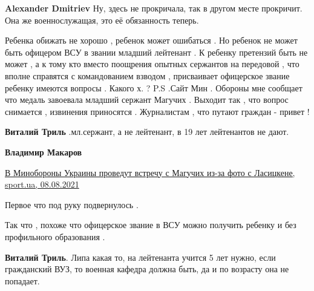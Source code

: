 \begin{itemize}
\begin{itemize}
\textbf{Alexander Dmitriev} Ну, здесь не прокричала, так в другом месте прокричит. Она же военнослужащая, это её обязанность теперь.
\end{itemize}


Ребенка обижать не хорошо , ребенок может ошибаться . Но ребенок не может быть
офицером ВСУ в звании младший лейтенант . К ребенку претензий быть не может , а
к тому кто вместо поощрения опытных сержантов на передовой , что вполне
справятся с командованием взводом , присваивает офицерское звание ребенку
имеются вопросы . Какого х. ? P.S .Сайт Мин . Обороны мне сообщает что медаль
завоевала младший сержант Магучих . Выходит так , что вопрос снимается ,
извинения приносятся . Журналистам , что путают граждан - привет !

\begin{itemize}

 
\textbf{Виталий Триль} .мл.сержант, а не лейтенант, в 19 лет лейтенантов не дают.


 
\textbf{Владимир Макаров} 

\href{https://sport.ua/news/549118-v-minoborony-ukrainy-provedut-vstrechu-s-maguchih-iz-za-foto-s-lasitskene}{%
В Минобороны Украины проведут встречу с Магучих из-за фото с Ласицкене, sport.ua, 08.08.2021%
}

Первое что под руку подвернулось .
 
Так что , похоже что офицерское звание в ВСУ можно получить ребенку и без профильного образования .


\textbf{Виталий Триль}. Липа какая то, на лейтенанта учится 5 лет нужно, если
гражданский ВУЗ, то военная кафедра должна быть, да и по возрасту она не
попадает.

 

\end{itemize}
\end{itemize}
